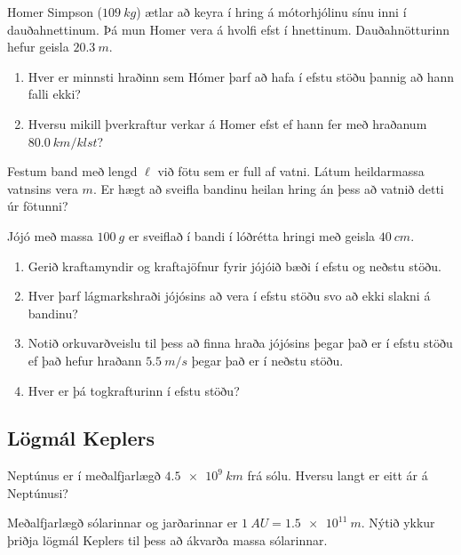 \begin{enumerate}[label = \textbf{Dæmi \thechapter.\arabic*.}]
\begin{minipage}{\linewidth}
\item Homer Simpson ($\SI{109}{kg}$) ætlar að keyra í hring á mótorhjólinu sínu inni í dauðahnettinum. Þá mun Homer vera á hvolfi efst í hnettinum. Dauðahnötturinn hefur geisla $\SI{20.3}{m}$.
\begin{enumerate}[label = \textbf{(\alph*})]
    \item Hver er minnsti hraðinn sem Hómer þarf að hafa í efstu stöðu þannig að hann falli ekki?
    
    \item Hversu mikill þverkraftur verkar á Homer efst ef hann fer með hraðanum $\SI{80.0}{km/klst}$?
\end{enumerate}

\end{minipage}

\item Festum band með lengd $\ell$ við fötu sem er full af vatni. Látum heildarmassa vatnsins vera $m$. Er hægt að sveifla bandinu heilan hring án þess að vatnið detti úr fötunni?

\item Jójó með massa $\SI{100}{g}$ er sveiflað í bandi í lóðrétta hringi með geisla $\SI{40}{cm}$.
\begin{enumerate}[label = \textbf{(\alph*)}]
    \item Gerið kraftamyndir og kraftajöfnur fyrir jójóið bæði í efstu og neðstu stöðu.
    \item Hver þarf lágmarkshraði jójósins að vera í efstu stöðu svo að ekki slakni á bandinu?
    \item Notið orkuvarðveislu til þess að finna hraða jójósins þegar það er í efstu stöðu ef það hefur hraðann $\SI{5.5}{m/s}$ þegar það er í neðstu stöðu.
    \item Hver er þá togkrafturinn í efstu stöðu?
\end{enumerate}

\subsection*{Lögmál Keplers}

\item Neptúnus er í meðalfjarlægð $\SI{4.5e9}{km}$ frá sólu. Hversu langt er eitt ár á Neptúnusi?

\item Meðalfjarlægð sólarinnar og jarðarinnar er $\SI{1}{AU} = \SI{1.5e11}{m}$. Nýtið ykkur þriðja lögmál Keplers til þess að ákvarða massa sólarinnar.


\end{enumerate}
